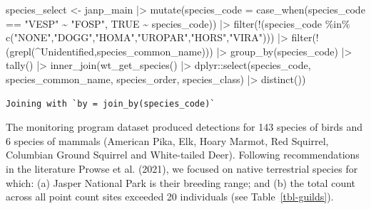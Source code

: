 \documentclass[
  letterpaper,
  DIV=11,
  numbers=noendperiod]{scrartcl}
\newenvironment{Shaded}{\begin{snugshade}}{\end{snugshade}}
\newcommand{\AttributeTok}[1]{\textcolor[rgb]{0.40,0.45,0.13}{#1}}
\newcommand{\ConstantTok}[1]{\textcolor[rgb]{0.56,0.35,0.01}{#1}}
\newcommand{\FunctionTok}[1]{\textcolor[rgb]{0.28,0.35,0.67}{#1}}
\newcommand{\NormalTok}[1]{\textcolor[rgb]{0.00,0.23,0.31}{#1}}
\newcommand{\OtherTok}[1]{\textcolor[rgb]{0.00,0.23,0.31}{#1}}
\newcommand{\SpecialCharTok}[1]{\textcolor[rgb]{0.37,0.37,0.37}{#1}}
\newcommand{\StringTok}[1]{\textcolor[rgb]{0.13,0.47,0.30}{#1}}
\begin{document}
\begin{Shaded}
\begin{Highlighting}[]
\NormalTok{species\_select }\OtherTok{\textless{}{-}}\NormalTok{ janp\_main }\SpecialCharTok{|\textgreater{}}
  \FunctionTok{mutate}\NormalTok{(}\AttributeTok{species\_code =} \FunctionTok{case\_when}\NormalTok{(species\_code }\SpecialCharTok{==} \StringTok{"VESP"} \SpecialCharTok{\textasciitilde{}} \StringTok{"FOSP"}\NormalTok{, }\ConstantTok{TRUE} \SpecialCharTok{\textasciitilde{}}\NormalTok{ species\_code)) }\SpecialCharTok{|\textgreater{}}
  \FunctionTok{filter}\NormalTok{(}\SpecialCharTok{!}\NormalTok{(species\_code }\SpecialCharTok{\%in\%} \FunctionTok{c}\NormalTok{(}\StringTok{"NONE"}\NormalTok{,}\StringTok{"DOGG"}\NormalTok{,}\StringTok{"HOMA"}\NormalTok{,}\StringTok{"UROPAR"}\NormalTok{,}\StringTok{"HORS"}\NormalTok{,}\StringTok{"VIRA"}\NormalTok{))) }\SpecialCharTok{|\textgreater{}}
  \FunctionTok{filter}\NormalTok{(}\SpecialCharTok{!}\NormalTok{(}\FunctionTok{grepl}\NormalTok{(}\StringTok{\textquotesingle{}\^{}Unidentified\textquotesingle{}}\NormalTok{,species\_common\_name))) }\SpecialCharTok{|\textgreater{}}
  \FunctionTok{group\_by}\NormalTok{(species\_code) }\SpecialCharTok{|\textgreater{}}
  \FunctionTok{tally}\NormalTok{() }\SpecialCharTok{|\textgreater{}}
  \FunctionTok{inner\_join}\NormalTok{(}\FunctionTok{wt\_get\_species}\NormalTok{() }\SpecialCharTok{|\textgreater{}}\NormalTok{ dplyr}\SpecialCharTok{::}\FunctionTok{select}\NormalTok{(species\_code, species\_common\_name, species\_order, species\_class) }\SpecialCharTok{|\textgreater{}} \FunctionTok{distinct}\NormalTok{())}
\end{Highlighting}
\end{Shaded}

\begin{verbatim}
Joining with `by = join_by(species_code)`
\end{verbatim}

The monitoring program dataset produced detections for 143 species of
birds and 6 species of mammals (American Pika, Elk, Hoary Marmot, Red
Squirrel, Columbian Ground Squirrel and White-tailed Deer). Following
recommendations in the literature Prowse et al. (2021), we focused on
native terrestrial species for which: (a) Jasper National Park is their
breeding range; and (b) the total count across all point count sites
exceeded 20 individuals (see Table~\ref{tbl-guilds}).
\end{document}
